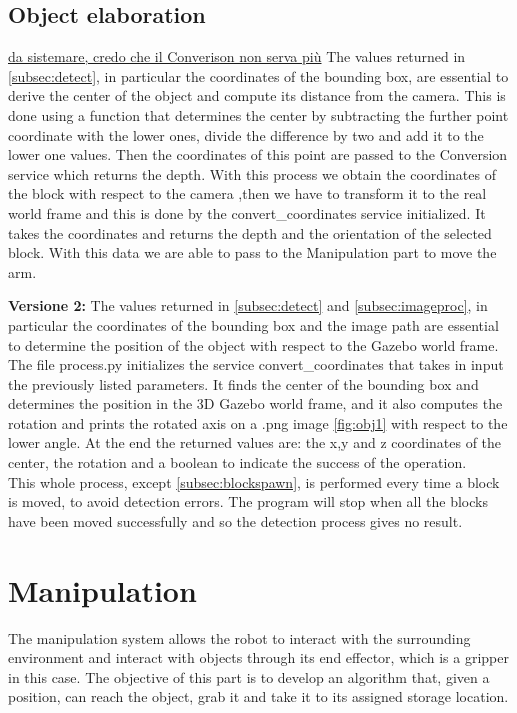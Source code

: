 \documentclass[12pt,a4paper]{article}
\begin{document}
\subsection{Object elaboration}\label{subsec:objel}
\uline{da sistemare, credo che il Converison non serva più}
The values returned in \ref{subsec:detect}, in particular the coordinates of the bounding box, are essential to derive the center of the object and compute its distance from the camera. This is done using a function that determines the center by subtracting the further point coordinate with the lower ones, divide the difference by two and add it to the lower one values. Then the coordinates of this point are passed to the Conversion service which returns the depth. With this process we obtain the coordinates of the block with respect to the camera ,then we have to transform it to the real world frame and this is done by the convert\_coordinates service initialized. It takes the coordinates and returns the depth and the orientation of the selected block. With this data we are able to pass to the Manipulation part to move the arm.

\textbf{Versione 2:} The values returned in \ref{subsec:detect} and \ref{subsec:imageproc}, in particular the coordinates of the bounding box and the image path are essential to determine the position of the object with respect to the Gazebo world frame. The file process.py initializes the service convert\_coordinates that takes in input the previously listed parameters. It finds the center of the bounding box and determines the position in the 3D Gazebo world frame, and it also computes the rotation and prints the rotated  axis on a .png image \ref{fig:obj1} with respect to the lower angle. At the end the returned values are: the x,y and z coordinates of the center, the rotation and a boolean to indicate the success of the operation.\\
This whole process, except \ref{subsec:blockspawn}, is performed every time a block is moved, to avoid detection errors. The program will stop when all the blocks have been moved successfully and so the detection process gives no result.


\section{Manipulation}\label{sec:manipulation}
The manipulation system allows the robot to interact with the surrounding environment and interact with objects through its end effector, which is a gripper in this case.
The objective of this part is to develop an algorithm that, given a position, can reach the object, grab it and take it to its assigned storage location.
\end{document}
